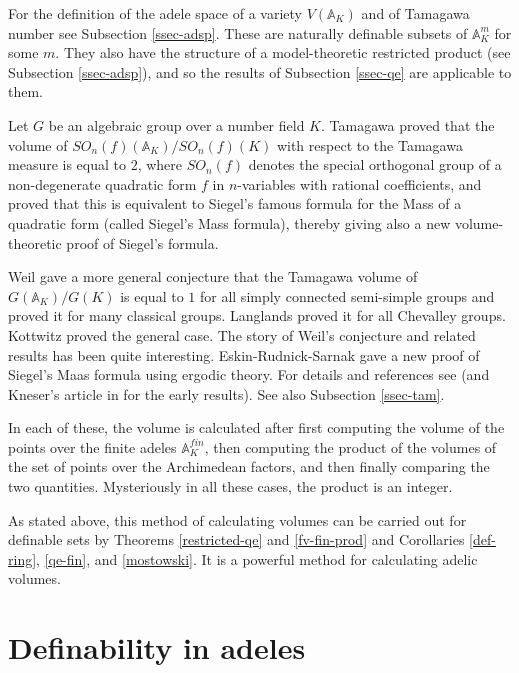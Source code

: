 \documentclass[12pt]{amsart}
\def\A{\mathbb{A}}
\numberwithin{equation}{section}
\begin{document}
\medskip

For the definition of the adele space of a variety $V(\A_K)$ and of Tamagawa number see Subsection \ref{ssec-adsp}. These are naturally definable subsets of $\A_K^m$ for some $m$. They also have the structure of a model-theoretic
restricted product (see  Subsection \ref{ssec-adsp}), and so the results of Subsection \ref{ssec-qe} are applicable to them.

Let $G$ be an algebraic group over a number field $K$. Tamagawa proved that the volume of 
$SO_n(f)(\A_K)/SO_n(f)(K)$ with respect to the Tamagawa measure is equal to $2$, where $SO_n(f)$ denotes the special orthogonal group of a non-degenerate 
quadratic form $f$ in $n$-variables with rational coefficients, and proved that this is equivalent to Siegel's famous formula for the Mass of a quadratic form (called Siegel's Mass formula), 
thereby giving also a new volume-theoretic proof of Siegel's formula. 

Weil gave a more general conjecture that the Tamagawa volume of $G(\A_K)/G(K)$ is equal to $1$ for all simply connected semi-simple groups and proved it for many classical groups. Langlands proved it for all Chevalley groups. Kottwitz proved the general case. The story of Weil's conjecture and related results has been quite interesting. Eskin-Rudnick-Sarnak gave a new proof of Siegel's Maas formula using ergodic theory. For details and references see \cite[Chapter 5]{Platonov-R-book} (and Kneser's article in \cite{CF} for the early results). See also Subsection \ref{ssec-tam}.

In each of these, the volume is calculated after first computing the volume of the points over the finite adeles $\A_K^{fin}$, then computing the product of the volumes of the set of points over the Archimedean factors, and then finally comparing the two quantities. Mysteriously in all these cases, the product is an integer. 

As stated above, this method of calculating volumes can be carried out for definable sets by 
Theorems \ref{restricted-qe} and \ref{fv-fin-prod} and Corollaries \ref{def-ring}, \ref{qe-fin}, and \ref{mostowski}. It is a powerful method for calculating adelic volumes.

\section{\bf Definability in adeles}\label{sec-def}

\medskip
\end{document}

